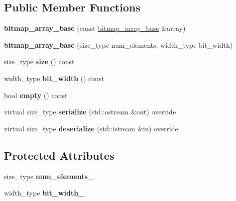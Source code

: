 \subsection*{Public Member Functions}
\begin{DoxyCompactItemize}
\item 
\mbox{\label{classdialog_1_1bitmap__array__base_ab6b857655a8de2706653b5a7996a625b}} 
{\bfseries bitmap\+\_\+array\+\_\+base} (const \hyperlink{classdialog_1_1bitmap__array__base}{bitmap\+\_\+array\+\_\+base} \&array)
\item 
\mbox{\label{classdialog_1_1bitmap__array__base_ac60cc574d5908417b53bfbd7a5809626}} 
{\bfseries bitmap\+\_\+array\+\_\+base} (size\+\_\+type num\+\_\+elements, width\+\_\+type bit\+\_\+width)
\item 
\mbox{\label{classdialog_1_1bitmap__array__base_a9bbb84f69a124c0a3b654e8570833fd8}} 
size\+\_\+type {\bfseries size} () const
\item 
\mbox{\label{classdialog_1_1bitmap__array__base_ada6add4a94341c88dc41de234b090ccb}} 
width\+\_\+type {\bfseries bit\+\_\+width} () const
\item 
\mbox{\label{classdialog_1_1bitmap__array__base_ab7816447c88267c25987ad45ceb65a5e}} 
bool {\bfseries empty} () const
\item 
\mbox{\label{classdialog_1_1bitmap__array__base_aa7a0aa644a5a37eaf87a902a20cee939}} 
virtual size\+\_\+type {\bfseries serialize} (std\+::ostream \&out) override
\item 
\mbox{\label{classdialog_1_1bitmap__array__base_a51a91fced01d96475dc24e23da2d06e8}} 
virtual size\+\_\+type {\bfseries deserialize} (std\+::istream \&in) override
\end{DoxyCompactItemize}
\subsection*{Protected Attributes}
\begin{DoxyCompactItemize}
\item 
\mbox{\label{classdialog_1_1bitmap__array__base_a8c831f6a67020d74dc29401c0dd9bce4}} 
size\+\_\+type {\bfseries num\+\_\+elements\+\_\+}
\item 
\mbox{\label{classdialog_1_1bitmap__array__base_a63b0af9fb47d61115af1e8f1038fcb02}} 
width\+\_\+type {\bfseries bit\+\_\+width\+\_\+}
\end{DoxyCompactItemize}
